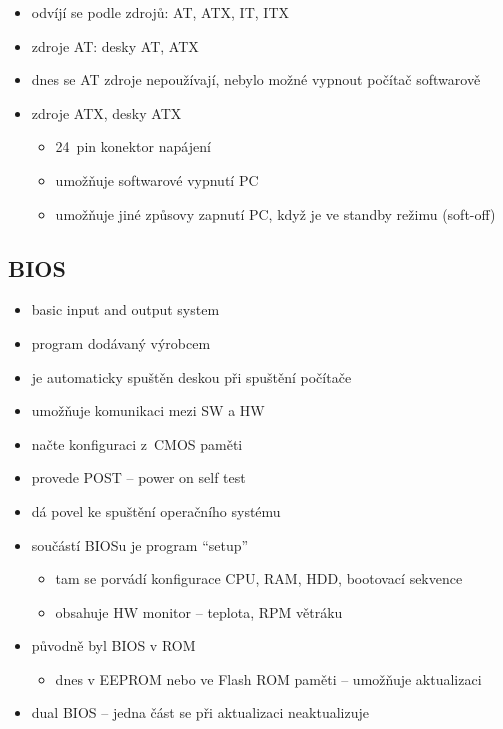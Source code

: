 \documentclass[a4paper,12pt]{article}
\providecommand{\tightlist}{%
\setlength{\itemsep}{0pt}\setlength{\parskip}{0pt}}
\begin{document}
\begin{itemize}
  \tightlist
  \item odvíjí se podle zdrojů: AT, ATX, IT, ITX
  \item zdroje AT: desky AT, ATX
  \item dnes se AT zdroje nepoužívají, nebylo možné vypnout počítač softwarově
  \item zdroje ATX, desky ATX
  \begin{itemize}
    \tightlist
    \item 24~pin konektor napájení
    \item umožňuje softwarové vypnutí PC
    \item umožňuje jiné způsovy zapnutí PC, když je ve standby režimu (soft-off)
  \end{itemize}
\end{itemize}

\subsection{BIOS}

\begin{itemize}
  \tightlist
  \item basic input and output system
  \item program dodávaný výrobcem
  \item je automaticky spuštěn deskou při spuštění počítače
  \item umožňuje komunikaci mezi SW a HW
  \item načte konfiguraci z~CMOS paměti
  \item provede POST -- power on self test
  \item dá povel ke spuštění operačního systému
  \item součástí BIOSu je program ``setup''
  \begin{itemize}
    \tightlist
    \item tam se porvádí konfigurace CPU, RAM, HDD, bootovací sekvence
    \item obsahuje HW monitor -- teplota, RPM větráku
  \end{itemize}
  \item původně byl BIOS v ROM
  \begin{itemize}
    \tightlist
    \item dnes v EEPROM nebo ve Flash ROM paměti -- umožňuje aktualizaci
  \end{itemize}
  \item dual BIOS -- jedna část se při aktualizaci neaktualizuje
\end{itemize}
\end{document}
